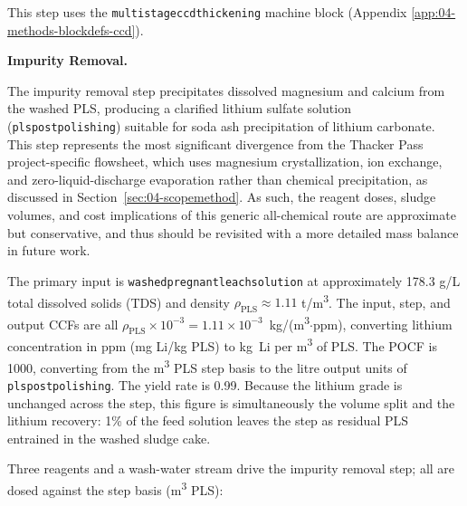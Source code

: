\documentclass{article}
\renewcommand\_{\textunderscore\allowbreak}
\begin{document}
This step uses the \texttt{multi\_stage\_ccd\_thickening} machine block (Appendix \ref{app:04-methods-blockdefs-ccd}).

\medskip
\noindent\textbf{Impurity Removal.}\quad

The impurity removal step precipitates dissolved magnesium and calcium from the washed PLS, producing a clarified lithium sulfate solution (\texttt{pls\_post\_polishing}) suitable for soda ash precipitation of lithium carbonate. This step represents the most significant divergence from the Thacker Pass project-specific flowsheet, which uses magnesium crystallization, ion exchange, and zero-liquid-discharge evaporation rather than chemical precipitation, as discussed in Section~\ref{sec:04-scopemethod}. As such, the reagent doses, sludge volumes, and cost implications of this generic all-chemical route are approximate but conservative, and thus should be revisited with a more detailed mass balance in future work.

The primary input is \texttt{washed\_pregnant\_leach\_solution} at approximately 178.3 g/L total dissolved solids (TDS) and density $\rho_\text{PLS} \approx 1.11$ \si{t/m^3}. The input, step, and output CCFs are all $\rho_\text{PLS} \times 10^{-3} = 1.11 \times 10^{-3}$~kg/(\si{m^3}$\cdot$ppm), converting lithium concentration in ppm (mg Li/kg PLS) to kg~Li per \si{m^3} of PLS. The POCF is 1000, converting from the \si{m^3} PLS step basis to the litre output units of \texttt{pls\_post\_polishing}. The yield rate is 0.99. Because the lithium grade is unchanged across the step, this figure is simultaneously the volume split and the lithium recovery: 1\% of the feed solution leaves the step as residual PLS entrained in the washed sludge cake.

Three reagents and a wash-water stream drive the impurity removal step; all are dosed against the step basis (\si{m^3} PLS):
\end{document}
